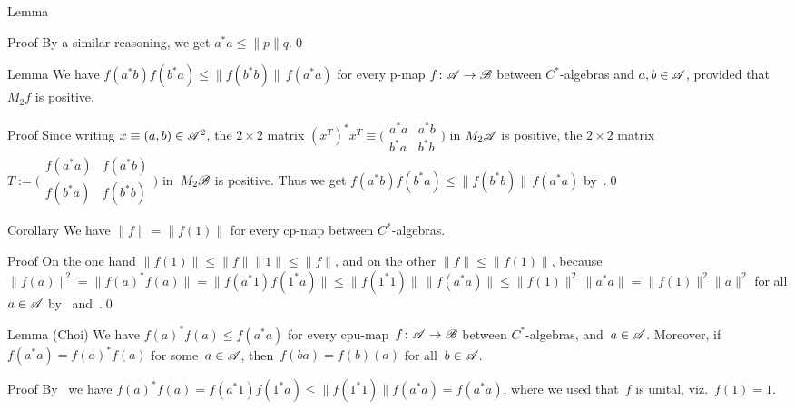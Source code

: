 \documentclass[a]{subfiles}
\begin{document}
\begin{parsec}
\begin{point}{Lemma}
\begin{point}{Proof}
By a similar reasoning, we get $a^*a\leq \|p\|q$.\qed
\end{point}
\end{point}
\begin{point}[cp-cs]{Lemma}%
We have $f(a^*b) f(b^*a)\leq \|f(b^*b)\|\,f(a^*a)$
for every p-map $f\colon \mathscr{A}\to\mathscr{B}$
between $C^*$-algebras
and $a,b\in\mathscr{A}$,
provided that $M_2f$ is positive.
\begin{point}{Proof}%
Since writing $x\equiv (a,b)\in \mathscr{A}^2$,
the $2\times 2$ matrix $(x^T)^* x^T\equiv 
	\bigl(
\begin{smallmatrix}
a^*a & a^*b \\
b^*a & b^* b
\end{smallmatrix} \bigr)$
in $M_2\mathscr{A}$
is positive,
the $2\times 2$ matrix $T:=\bigl(
\begin{smallmatrix}
	f(a^*a) & f(a^*b) \\
	f(b^*a) & f(b^* b)
\end{smallmatrix}\bigr)$
in~$M_2\mathscr{B}$ is positive.
Thus we get $f(a^*b) f(b^*a)\leq \|f(b^*b)\|\,f(a^*a)$
by~.\qed
\end{point}
\end{point}
\begin{point}{Corollary}
We have $\|f\|= \|f(1)\|$
for every cp-map between $C^*$-algebras.
\begin{point}{Proof}%
On the one hand $\|f(1)\|\leq \|f\|\|1\| \leq \|f\|$,
and on the other $\|f\|\leq \|f(1)\|$,
because
 $\|f(a)\|^2=\|f(a)^*f(a)\|=\|f(a^*1)f(1^*a)\|
\leq \|f(1^*1)\|\,\|f(a^*a)\|
\leq \|f(1)\|^2 \,\|a^*a\|
= \|f(1)\|^2 \|a\|^2$
for all $a\in \mathscr{A}$
by~ and~.\qed
\end{point}
\end{point}
\begin{point}[choi]{Lemma (Choi)}%
We have
$f(a)^*f(a) \leq f(a^* a)$ for
every
cpu-map~$f\colon \mathscr{A}\to\mathscr{B}$ between $C^*$-algebras,
and~$a\in\mathscr{A}$.
Moreover, if $f(a^*a)=f(a)^*f(a)$
for some~$a\in\mathscr{A}$,
then~$f(ba)=f(b)(a)$
for all~$b\in \mathscr{A}$.
\begin{point}{Proof}%
By~
we have $f(a)^*f(a)=f(a^* 1)f(1^* a) \leq
\|f(1^*1)\| f(a^*a)=f(a^*a)$,
where we used that~$f$ is unital, viz.~$f(1)=1$.


\end{point}
\end{point}
\end{parsec}
\end{document}
